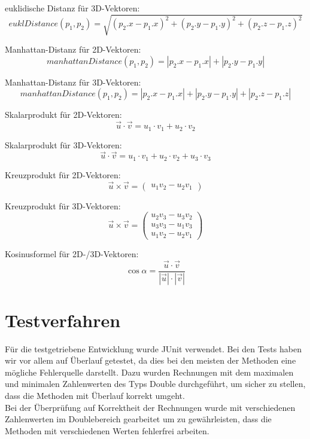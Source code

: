\documentclass[a4paper,11pt]{scrartcl}
\begin{document}
euklidische Distanz für 3D-Vektoren:
\[ euklDistance(p_1,p_2) = \sqrt{(p_2.x - p_1.x)^2 + (p_2.y - p_1.y)^2 + (p_2.z - p_1.z)^2} \]

Manhattan-Distanz für 2D-Vektoren:
\[ manhattanDistance(p_1,p_2) = | p_2.x - p_1.x | + | p_2.y - p_1.y | \]

Manhattan-Distanz für 3D-Vektoren:
\[ manhattanDistance(p_1,p_2) = | p_2.x - p_1.x | + | p_2.y - p_1.y | + | p_2.z - p_1.z |\]

Skalarprodukt für 2D-Vektoren:
\[ \vec u \cdot \vec v = u_1 \cdot v_1 + u_2 \cdot v_2\]

Skalarprodukt für 3D-Vektoren:
\[ \vec u \cdot \vec v = u_1 \cdot v_1 + u_2 \cdot v_2 + u_3 \cdot v_3\]

Kreuzprodukt für 2D-Vektoren:
\[ \vec u \times \vec v = \begin{pmatrix}
u_1v_2 - u_2v_1
\end{pmatrix}\]

Kreuzprodukt für 3D-Vektoren:
\[ \vec u \times \vec v = \begin{pmatrix}
u_2v_3 - u_3v_2\\
u_3v_3 - u_1v_3\\
u_1v_2 - u_2v_1
\end{pmatrix}\]

Kosinusformel für 2D-/3D-Vektoren:
\[ \cos \alpha = \frac{\vec u \cdot \vec v}{| \vec  u | \cdot | \vec  v | } \]

\section{Testverfahren}
Für die testgetriebene Entwicklung wurde JUnit verwendet. Bei den Tests haben wir vor allem auf Überlauf getestet, da dies bei den meisten der Methoden eine mögliche Fehlerquelle darstellt. Dazu wurden Rechnungen mit dem maximalen und minimalen Zahlenwerten des Typs Double durchgeführt, um sicher zu stellen, dass die Methoden mit Überlauf korrekt umgeht. 
\\
Bei der Überprüfung auf Korrektheit der Rechnungen wurde mit verschiedenen Zahlenwerten im Doublebereich gearbeitet um zu gewährleisten, dass die Methoden mit verschiedenen Werten fehlerfrei arbeiten. 
\end{document}
